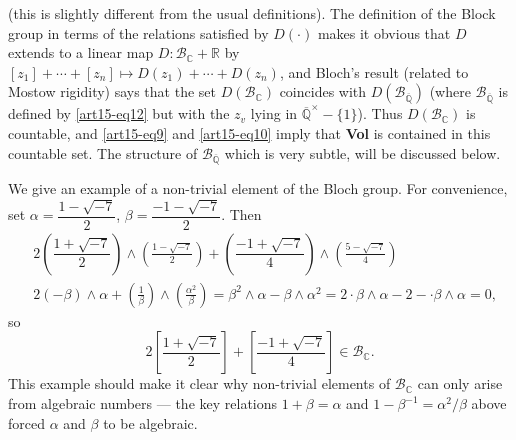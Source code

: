 (this is slightly different from the usual definitions). The definition of the Block group in terms of the relations satisfied by $D(\cdot)$ makes it obvious that $D$ extends to a linear map $D:\mathscr{B}_{\mathbb{C}}+\mathbb{R}$ by $[z_{1}]+\cdots+[z_{n}]\mapsto D(z_{1})+\cdots+D(z_{n})$, and Bloch's result (related to Mostow rigidity) says that the set $D(\mathscr{B}_{\mathbb{C}})$ coincides with $D(\mathscr{B}_{\overline{\mathbb{Q}}})$ (where $\mathscr{B}_{\overline{\mathbb{Q}}}$ is defined by \eqref{art15-eq12} but with the $z_{v}$ lying in $\overline{\mathbb{Q}}^{\times}-\{1\}$). Thus $D(\mathscr{B}_{\mathbb{C}})$ is countable, and \eqref{art15-eq9} and \eqref{art15-eq10} imply that {\bf Vol} is contained in this countable set. The structure of $\mathscr{B}_{\overline{\mathbb{Q}}}$ which is very subtle, will be discussed below.

We give an example of a non-trivial element of the Bloch group. For convenience, set $\alpha=\dfrac{1-\sqrt{-7}}{2}$, $\beta=\dfrac{-1-\sqrt{-7}}{2}$. Then 
\begin{align*}
& 2\left(\dfrac{1+\sqrt{-7}}{2}\right)\wedge \left(\frac{1-\sqrt{-7}}{2}\right)+\left(\dfrac{-1+\sqrt{-7}}{4}\right)\wedge\left(\frac{5-\sqrt{-7}}{4}\right)\\
& 2(-\beta)\wedge\alpha+\left(\frac{1}{\beta}\right)\wedge\left(\frac{\alpha^{2}}{\beta}\right)=\beta^{2}\wedge \alpha-\beta\wedge\alpha^{2}=2\cdot \beta\wedge \alpha-2-\cdot \beta \wedge\alpha=0,
\end{align*}\pageoriginale
so
\begin{equation}
2\left[\dfrac{1+\sqrt{-7}}{2}\right]+\left[\dfrac{-1+\sqrt{-7}}{4}\right]\in \mathscr{B}_{\mathbb{C}}.\label{art15-eq13}
\end{equation}
This example should make it clear why non-trivial elements of $\mathscr{B}_{\mathbb{C}}$ can only arise from algebraic numbers --- the key relations $1+\beta=\alpha$ and $1-\beta^{-1}=\alpha^{2}/\beta$ above forced $\alpha$ and $\beta$ to be algebraic.

